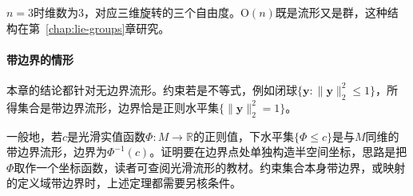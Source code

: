 $n=3$时维数为$3$，对应三维旋转的三个自由度。$\mathrm O(n)$既是流形又是群，这种结构在第~\ref{chap:lie-groups}章研究。

\paragraph{带边界的情形}
本章的结论都针对无边界流形。约束若是不等式，例如闭球$\{\bm y:\lVert\bm y\rVert_2^2\leq1\}$，所得集合是带边界流形，边界恰是正则水平集$\{\lVert\bm y\rVert_2^2=1\}$。

一般地，若$c$是光滑实值函数$\Phi:M\to\mathbb R$的正则值，下水平集$\{\Phi\leq c\}$是与$M$同维的带边界流形，边界为$\Phi^{-1}(c)$。证明要在边界点处单独构造半空间坐标，思路是把$\Phi$取作一个坐标函数，读者可查阅光滑流形的教材。约束集合本身带边界，或映射的定义域带边界时，上述定理都需要另核条件。
